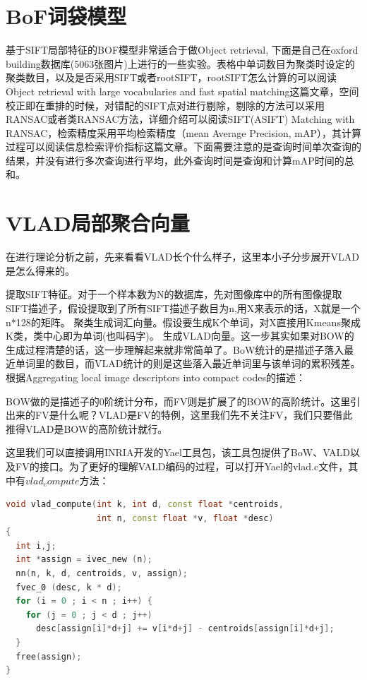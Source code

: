 \documentclass[color=cyan,mathpazo,titlestyle=hang]{elegantbook}
\begin{document}
\section{BoF词袋模型}

基于SIFT局部特征的BOF模型非常适合于做Object retrieval, 下面是自己在oxford building数据库(5063张图片)上进行的一些实验。表格中单词数目为聚类时设定的聚类数目，以及是否采用SIFT或者rootSIFT，rootSIFT怎么计算的可以阅读Object retrieval with large vocabularies and fast spatial matching这篇文章，空间校正即在重排的时候，对错配的SIFT点对进行剔除，剔除的方法可以采用RANSAC或者类RANSAC方法，详细介绍可以阅读SIFT(ASIFT) Matching with RANSAC，检索精度采用平均检索精度（mean Average Precision, mAP），其计算过程可以阅读信息检索评价指标这篇文章。下面需要注意的是查询时间单次查询的结果，并没有进行多次查询进行平均，此外查询时间是查询和计算mAP时间的总和。

\section{VLAD局部聚合向量}

在进行理论分析之前，先来看看VLAD长个什么样子，这里本小子分步展开VLAD是怎么得来的。

提取SIFT特征。对于一个样本数为N的数据库，先对图像库中的所有图像提取SIFT描述子，假设提取到了所有SIFT描述子数目为n,用X来表示的话，X就是一个n*128的矩阵。
聚类生成词汇向量。假设要生成K个单词，对X直接用Kmeans聚成K类，类中心即为单词(也叫码字)。
生成VLAD向量。这一步其实如果对BOW的生成过程清楚的话，这一步理解起来就非常简单了。BoW统计的是描述子落入最近单词里的数目，而VLAD统计的则是这些落入最近单词里与该单词的累积残差。根据Aggregating local image descriptors into compact codes的描述：

BOW做的是描述子的0阶统计分布，而FV则是扩展了的BOW的高阶统计。这里引出来的FV是什么呢？VLAD是FV的特例，这里我们先不关注FV，我们只要借此推得VLAD是BOW的高阶统计就行。

这里我们可以直接调用INRIA开发的Yael工具包，该工具包提供了BoW、VALD以及FV的接口。为了更好的理解VALD编码的过程，可以打开Yael的vlad.c文件，其中有$vlad_compute$方法：

\begin{lstlisting}[language=c++]
void vlad_compute(int k, int d, const float *centroids, 
                  int n, const float *v, float *desc)  
{
  int i,j;
  int *assign = ivec_new (n);
  nn(n, k, d, centroids, v, assign);
  fvec_0 (desc, k * d);
  for (i = 0 ; i < n ; i++) {
    for (j = 0 ; j < d ; j++) 
      desc[assign[i]*d+j] += v[i*d+j] - centroids[assign[i]*d+j];
  }      
  free(assign);
}
\end{lstlisting}
\end{document}
